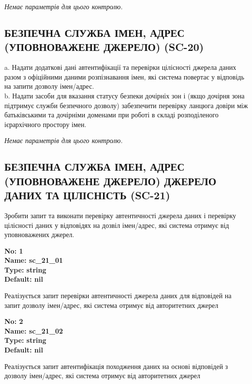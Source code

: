 \documentclass{article}
\begin{document}
\vspace{10pt}
\textit{Немає параметрів для цього контролю.}
\vspace{10pt}


\subsection{БЕЗПЕЧНА СЛУЖБА ІМЕН, АДРЕС (УПОВНОВАЖЕНЕ ДЖЕРЕЛО) (SC-20)}
a. Надати додаткові дані автентифікації та перевірки цілісності джерела даних разом з офіційними даними розпізнавання імен, які система повертає у відповідь на запити дозволу імен/адрес.\\ 
b. Надати засоби для вказання статусу безпеки дочірніх зон і (якщо дочірня зона підтримує служби безпечного дозволу) забезпечити перевірку ланцюга довіри між батьківськими та дочірніми доменами при роботі в складі розподіленого ієрархічного простору імен.

\vspace{10pt}
\textit{Немає параметрів для цього контролю.}
\vspace{10pt}


\subsection{БЕЗПЕЧНА СЛУЖБА ІМЕН, АДРЕС (УПОВНОВАЖЕНЕ ДЖЕРЕЛО) ДЖЕРЕЛО ДАНИХ ТА ЦІЛІСНІСТЬ (SC-21)}
Зробити запит та виконати перевірку автентичності джерела даних і перевірку цілісності даних у відповідях на дозвіл імен/адрес, які система отримує від уповноважених джерел.

\vspace{10pt}
{\footnotesize\bfseries
No: 1\\
Name: sc\_\allowbreak{}21\_\allowbreak{}01\\
Type: string\\
Default: nil
}

{\footnotesize Реалізується запит перевірки автентичності джерела даних для відповідей на запит дозволу імен/адрес, які система отримує від авторитетних джерел}


{\footnotesize\bfseries
No: 2\\
Name: sc\_\allowbreak{}21\_\allowbreak{}02\\
Type: string\\
Default: nil
}

{\footnotesize Реалізується запит автентифікація походження даних на основі відповідей з дозволу імен/адрес, які система отримує від авторитетних джерел}
\end{document}
